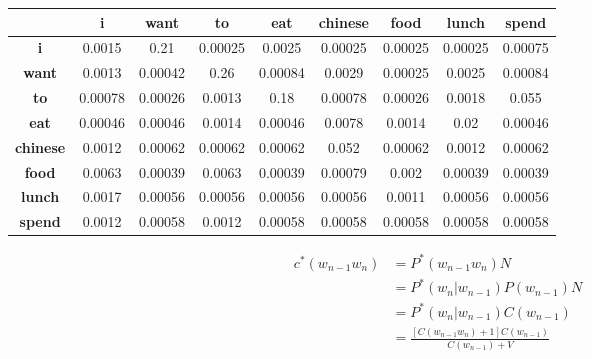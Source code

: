         \begin{center}
            \begin{tabular}{|c|c|c|c|c|c|c|c|c|}
                \hline
                 & \textbf{i} & \textbf{want} & \textbf{to} & \textbf{eat} & \textbf{chinese} & \textbf{food} & \textbf{lunch} & \textbf{spend} \\ \hline
                \textbf{i} & 0.0015 & 0.21 & {\color{blue}0.00025} & 0.0025 & {\color{blue}0.00025} & {\color{blue}0.00025} & {\color{blue}0.00025} & {\color{blue}0.00075} \\ 
                \textbf{want} & 0.0013 & {\color{blue}0.00042} & 0.26 & 0.00084 & 0.0029 & {\color{blue}0.00025} & 0.0025 & 0.00084 \\ 
                \textbf{to} & {\color{blue}0.00078} & {\color{blue}0.00026} & 0.0013 & 0.18 & {\color{blue}0.00078} & {\color{blue}0.00026} & 0.0018 & 0.055 \\ 
                \textbf{eat} & {\color{blue}0.00046} & {\color{blue}0.00046} & 0.0014 & {\color{blue}0.00046} & 0.0078 & 0.0014 & 0.02 & {\color{blue}0.00046} \\ 
                \textbf{chinese} & 0.0012 & {\color{blue}0.00062} & {\color{blue}0.00062} & {\color{blue}0.00062} & 0.052 & {\color{blue}0.00062} & 0.0012 & {\color{blue}0.00062} \\ 
                \textbf{food} & 0.0063 & {\color{blue}0.00039} & 0.0063 & {\color{blue}0.00039} & 0.00079 & 0.002 & {\color{blue}0.00039} & {\color{blue}0.00039} \\ 
                \textbf{lunch} & 0.0017 & {\color{blue}0.00056} & {\color{blue}0.00056} & {\color{blue}0.00056} & {\color{blue}0.00056} & 0.0011 & {\color{blue}0.00056} & {\color{blue}0.00056} \\ 
                \textbf{spend} & 0.0012 & {\color{blue}0.00058} & 0.0012 & {\color{blue}0.00058} & {\color{blue}0.00058} & {\color{blue}0.00058} & {\color{blue}0.00058} & {\color{blue}0.00058} \\ \hline
            \end{tabular}
        \end{center}

        \[
        \begin{aligned}
            c^*(w_{n-1}w_n) &= P^*(w_{n-1}w_n)N \\
            &= P^*(w_n|w_{n-1})P(w_{n-1})N \\
            &= P^*(w_n|w_{n-1})C(w_{n-1}) \\
            &= \frac{[C(w_{n-1}w_n) + 1]C(w_{n-1})}{C(w_{n-1}) + V}
        \end{aligned}
        \]

